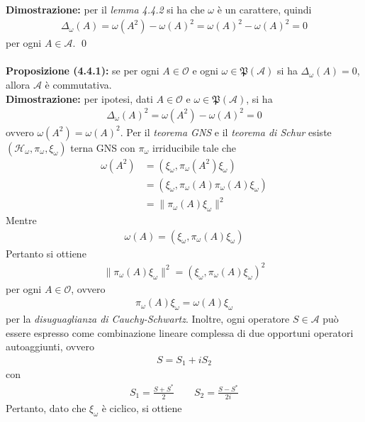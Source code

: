 \documentclass{article}
\numberwithin{equation}{subsection}
\begin{document}
\textbf{Dimostrazione:} per il \textit{lemma 4.4.2} si ha che $\omega$ è un carattere, quindi
\begin{align*}
    \Delta_\omega(A) = \omega(A^2) - \omega(A)^2 = \omega(A)^2 - \omega(A)^2 = 0
\end{align*}
per ogni $A \in \mathscr{A}$. \qed \\ \\
\textbf{Proposizione (4.4.1):} se per ogni $A \in \mathscr{O}$ e ogni $\omega \in \mathfrak{P}(\mathscr{A})$ si ha $\Delta_\omega(A) = 0$, allora $\mathscr{A}$ è commutativa. \\

\textbf{Dimostrazione:} per ipotesi, dati $A \in \mathscr{O}$ e $\omega \in \mathfrak{P}(\mathscr{A})$, si ha
\begin{align*}
    \Delta_\omega(A)^2 = \omega(A^2) - \omega(A)^2 = 0
\end{align*}
ovvero $\omega(A^2) = \omega(A)^2$. Per il \textit{teorema GNS} e il \textit{teorema di Schur} esiste $(\mathcal{H}_\omega, \pi_\omega, \xi_\omega)$ terna GNS con $\pi_\omega$ irriducibile tale che
\begin{align*}
    \omega(A^2) &= (\xi_\omega, \pi_\omega(A^2)\xi_\omega) \\
    &= (\xi_\omega, \pi_\omega(A)\pi_\omega(A)\xi_\omega) \\
    &= \|\pi_\omega(A)\xi_\omega\|^2
\end{align*}
Mentre
\begin{align*}
    \omega(A) = (\xi_\omega, \pi_\omega(A)\xi_\omega)
\end{align*}
Pertanto si ottiene
\begin{align*}
    \|\pi_\omega(A)\xi_\omega\|^2 = (\xi_\omega, \pi_\omega(A)\xi_\omega)^2
\end{align*}
per ogni $A \in \mathscr{O}$, ovvero
\begin{align*}
    \pi_\omega(A)\xi_\omega = \omega(A)\xi_\omega
\end{align*}
per la \textit{disuguaglianza di Cauchy-Schwartz}. Inoltre, ogni operatore $S \in \mathscr{A}$ può essere espresso come combinazione lineare complessa di due opportuni operatori autoaggiunti, ovvero
\begin{align*}
    S = S_1 + iS_2
\end{align*}
con
\begin{align*}
    S_1 = \frac{S + S^*}{2} \qquad S_2 = \frac{S - S^*}{2i}
\end{align*}
Pertanto, dato che $\xi_\omega$ è ciclico, si ottiene
\end{document}
